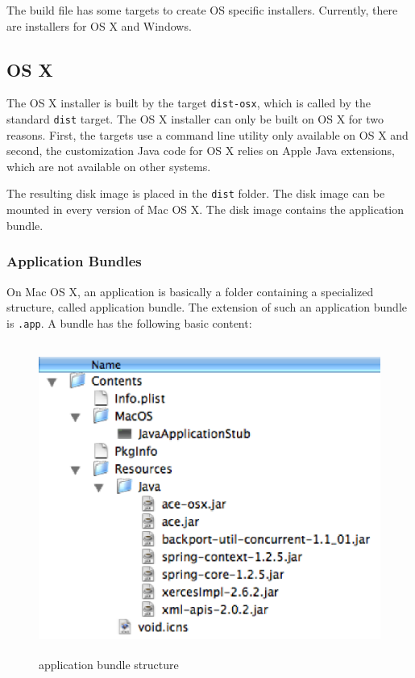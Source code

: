 \documentclass[11pt,a4paper]{article}
\begin{document}
The build file has some targets to create OS specific installers. Currently,
there are installers for OS X and Windows.

\subsection{OS X}
The OS X installer is built by the target \texttt{dist-osx}, which is 
called by the standard \texttt{dist} target. The OS X installer can only
be built on OS X for two reasons. First, the targets use a command line
utility only available on OS X and second, the customization Java code
for OS X relies on Apple Java extensions, which are not available on
other systems.

The resulting disk image is placed in the \texttt{dist} folder. The disk
image can be mounted in every version of Mac OS X. The disk image contains
the application bundle.

\subsubsection{Application Bundles}
On Mac OS X, an application is basically a folder containing a specialized
structure, called application bundle. The extension of such an application
bundle is \texttt{.app}. A bundle has the following basic content:

\begin{figure}[H]
 \centering
 \includegraphics[width=12.3cm,height=10.2cm]{../images/developersguide/app-bundle.eps}
 \caption{application bundle structure}
\end{figure}
\end{document}
